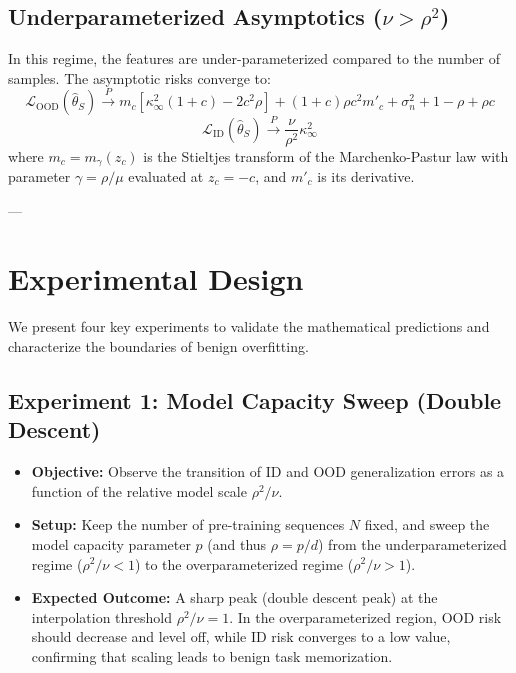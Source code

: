 \documentclass[11pt,a4paper]{article}
\begin{document}
\subsection{Underparameterized Asymptotics ($\nu > \rho^2$)}
In this regime, the features are under-parameterized compared to the number of samples. The asymptotic risks converge to:
\begin{equation}
    \mathcal{L}_{\text{OOD}}(\hat{\theta}_S) \xrightarrow{P} m_c \left[ \kappa_{\infty}^2 (1 + c) - 2 c^2 \rho \right] + (1 + c) \rho c^2 m'_c + \sigma_n^2 + 1 - \rho + \rho c
\end{equation}
\begin{equation}
    \mathcal{L}_{\text{ID}}(\hat{\theta}_S) \xrightarrow{P} \frac{\nu}{\rho^2} \kappa_{\infty}^2
\end{equation}
where $m_c = m_{\gamma}(z_c)$ is the Stieltjes transform of the Marchenko-Pastur law with parameter $\gamma = \rho/\mu$ evaluated at $z_c = -c$, and $m'_c$ is its derivative.

---

\section{Experimental Design}
We present four key experiments to validate the mathematical predictions and characterize the boundaries of benign overfitting.

\subsection{Experiment 1: Model Capacity Sweep (Double Descent)}
\begin{itemize}
    \item \textbf{Objective:} Observe the transition of ID and OOD generalization errors as a function of the relative model scale $\rho^2/\nu$.
    \item \textbf{Setup:} Keep the number of pre-training sequences $N$ fixed, and sweep the model capacity parameter $p$ (and thus $\rho = p/d$) from the underparameterized regime ($\rho^2/\nu < 1$) to the overparameterized regime ($\rho^2/\nu > 1$).
    \item \textbf{Expected Outcome:} A sharp peak (double descent peak) at the interpolation threshold $\rho^2/\nu = 1$. In the overparameterized region, OOD risk should decrease and level off, while ID risk converges to a low value, confirming that scaling leads to benign task memorization.
\end{itemize}
\end{document}
